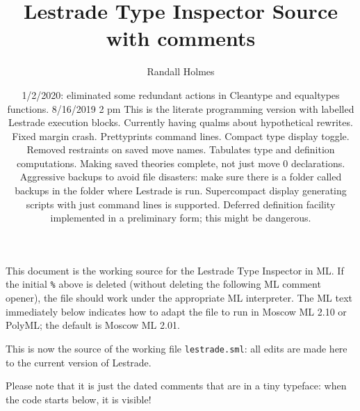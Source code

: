 \documentclass{article}
\title{Lestrade Type Inspector Source with comments}
\author{Randall Holmes}
\date{1/2/2020:  eliminated some redundant actions in Cleantype and equaltypes functions. 8/16/2019 2  pm  This is the literate programming version with labelled Lestrade execution blocks.  Currently having qualms about hypothetical rewrites.  Fixed margin crash.  Prettyprints command lines.  Compact type display toggle.  Removed restraints on saved move names.  Tabulates type and definition computations.  Making saved theories complete, not just move 0 declarations.   Aggressive backups to avoid file disasters:  make sure there is a folder called backups in the folder where Lestrade is run.  Supercompact display generating scripts with just command lines is supported.  Deferred definition facility implemented in a preliminary form;  this might be dangerous.}
\begin{document}
\maketitle

This document is the working source for the Lestrade Type Inspector in ML.  
If the initial {\tt \%} above is deleted (without deleting the following ML comment opener), 
the file should work under the appropriate ML interpreter.  The ML text immediately below indicates how to adapt the file to run in Moscow ML 2.10 or PolyML;
the default is Moscow ML 2.01.

This is now the source of the working file {\tt lestrade.sml}:  all edits are made here to the current version of Lestrade.

Please note that it is just the dated comments that are in a tiny typeface:  when the code starts below, it is visible!
\end{document}
